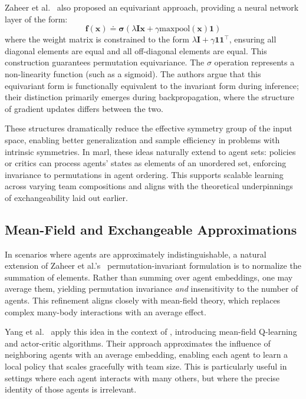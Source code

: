 Zaheer et al.~\cite{zaheer2017} also proposed an equivariant approach,
providing a neural network layer of the form:
\begin{equation*}
    \mathbf{f}(\mathbf{x}) \doteq \mathbf\sigma (\lambda\mathbf{Ix} 
    + \gamma \text{maxpool}(\mathbf{x})\mathbf{1}) 
\end{equation*}
where the weight matrix is constrained to the form 
\(\lambda\mathbf{I} + \gamma\mathbf{11}^\top\), ensuring all 
diagonal elements are equal and all off-diagonal elements are equal. 
This construction guarantees permutation equivariance.
The \(\sigma\) operation represents a non-linearity function (such as a sigmoid).
The authors argue that this equivariant form is functionally equivalent to the 
invariant form during inference; their distinction primarily emerges during backpropagation, 
where the structure of gradient updates differs between the two.

These structures dramatically reduce the effective symmetry 
group of the input space, enabling better generalization and 
sample efficiency in problems with intrinsic symmetries. 
In \gls{marl}, these ideas naturally extend to agent sets: 
policies or critics can process agents' states as elements 
of an unordered set, enforcing invariance to permutations in agent ordering. 
This supports scalable learning across varying team compositions 
and aligns with the theoretical underpinnings of exchangeability laid out earlier.


\subsection{Mean-Field and Exchangeable Approximations}

In scenarios where agents are approximately indistinguishable, 
a natural extension of Zaheer et al.'s~\cite{zaheer2017} 
permutation-invariant formulation is to normalize the summation of elements. 
Rather than summing over agent embeddings, one may average them,
yielding permutation invariance \emph{and} insensitivity to the number of agents. 
This refinement aligns closely with mean-field theory, which replaces complex 
many-body interactions with an average effect.

Yang et al.~\cite{yang2018} apply this idea in the context of , 
introducing mean-field Q-learning and actor-critic algorithms. 
Their approach approximates the influence of neighboring agents with 
an average embedding, enabling each agent to learn a local policy that 
scales gracefully with team size. This is particularly 
useful in settings where each agent interacts with many others, 
but where the precise identity of those agents is irrelevant.

